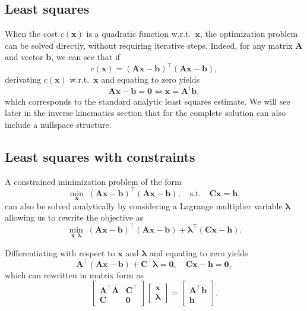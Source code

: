 \documentclass[10pt,a4paper]{article} %
\newcommand{\trsp}{{\scriptscriptstyle\top}}
\newcommand{\psin}{{\dagger}}
\begin{document}
\subsection{Least squares}\label{sec:LS}

When the cost $c(\bm{x})$ is a quadratic function w.r.t.\ $\bm{x}$, the optimization problem can be solved directly, without requiring iterative steps. Indeed, for any matrix $\bm{A}$ and vector $\bm{b}$, we can see that if
\begin{equation*}
	c(\bm{x}) = (\bm{A}\bm{x}-\bm{b})^\trsp (\bm{A}\bm{x}-\bm{b}),
\end{equation*}
derivating $c(\bm{x})$ w.r.t.\ $\bm{x}$ and equating to zero yields
\begin{equation*}
	\bm{A}\bm{x} - \bm{b} = \bm{0} 
	\iff \bm{x} = \bm{A}^\psin\bm{b},
\end{equation*}
which corresponds to the standard analytic least squares estimate. We will see later in the inverse kinematics section that for the complete solution can also include a nullspace structure. 


\subsection{Least squares with constraints}\label{sec:LSconstraints}

A constrained minimization problem of the form
\begin{equation}
	\min_{\bm{x}} \; (\bm{A}\bm{x}-\bm{b})^\trsp (\bm{A}\bm{x}-\bm{b}),
	\quad\text{s.t.}\quad
	\bm{C}\bm{x}=\bm{h},
	\label{eq:LSconstraints} 
\end{equation}
can also be solved analytically by considering a Lagrange multiplier variable $\bm{\lambda}$ allowing us to rewrite the objective as
\begin{equation*}
	\min_{\bm{x},\bm{\lambda}} \; (\bm{A}\bm{x}-\bm{b})^\trsp (\bm{A}\bm{x}-\bm{b})
	+ \bm{\lambda}^\trsp (\bm{C}\bm{x}-\bm{h}). 
\end{equation*}

Differentiating with respect to $\bm{x}$ and $\bm{\lambda}$ and equating to zero yields
\begin{equation*}
	\bm{A}^\trsp(\bm{A}\bm{x} - \bm{b}) + \bm{C}^\trsp \bm{\lambda} = \bm{0},
	\quad
	\bm{C}\bm{x} - \bm{h} = \bm{0},
\end{equation*}
which can rewritten in matrix form as
\begin{equation*}
	\begin{bmatrix} \bm{A}^\trsp\!\bm{A} & \bm{C}^\trsp \\ \bm{C} & \bm{0} \end{bmatrix} 	
	\begin{bmatrix} \bm{x} \\ \bm{\lambda} \end{bmatrix}
	=
	\begin{bmatrix} \bm{A}^\trsp\bm{b} \\ \bm{h} \end{bmatrix}.
\end{equation*}
\end{document}
